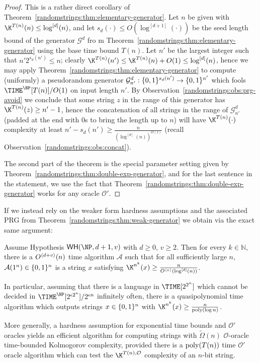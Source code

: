 \begin{proof}
This is a rather direct corollary of Theorem~\ref{randomstrings:thm:elementary-generator}. Let $n$ be given with $\K^{T(n)}(n) \leq \log^{[d]}(n)$, and let $s_d(\cdot) \leq O(\log^{[d+1]}(\cdot))$ be the seed length bound of the generator $\mathcal{G}^d$ fro m Theorem~\ref{randomstrings:thm:elementary-generator} using the base time bound $T(n)$. Let $n'$ be the largest integer such that $n'2^{s_d(n')} \leq n$; clearly $\K^{T(n)}(n') \leq \K^{T(n)}(n) + O(1) \leq \log^{[d]}(n)$, hence we may apply Theorem~\ref{randomstrings:thm:elementary-generator} to compute (uniformly) a pseudorandom generator $\mathcal{G}^d_{n'}: \{0,1\}^{s_d(n')} \to \{0,1\}^{n'}$ which fools $\TIME^{\NP}[T(n)]/O(1)$ on input length $n'$. By Observation~\ref{randomstrings:obs:prg-avoid} we conclude that some string $z$ in the range of this generator has $\K^{T(n)}(z) \geq n'-1$, hence the concatenation of all strings in the range of $\mathcal{G}^d_{n'}$ (padded at the end with $0$s to bring the length up to $n$) will have $\K^{T(n)}(\cdot)$ complexity at least $n' - s_d(n') \geq \frac{n}{(\log^{[d]}(n))^{O(1)}}$ (recall Observation~\ref{randomstrings:obs:concat}). 

The second part of the theorem is the special parameter setting given by Theorem~\ref{randomstrings:thm:double-exp-generator}, and for the last sentence in the statement, we use the fact that Theorem~\ref{randomstrings:thm:double-exp-generator} works for any oracle $\mathcal{O'}$.
\end{proof}

If we instead rely on the weaker form hardness assumptions and the associated PRG from Theorem~\ref{randomstrings:thm:weak-generator} we obtain via the exact same argument:
\begin{theorem}\label{randomstrings:thm:elementary-random-strings-weak}
Assume Hypothesis $\WH(\NP,d+1,v)$ with $d \geq 0$, $v \geq 2$. Then for every $k \in \mathbb{N}$, there is a $O^{\langle d+v \rangle}(n)$ time algorithm $\mathcal{A}$ such that for all sufficiently large $n$, $\mathcal{A}(1^n) \in \{0,1\}^n$  is a string $x$ satisfying $\K^{n^k}(x) \geq  \frac{n}{\od{v}(\log^{[d]}(n))}$.

In particular, assuming that there is a language in $\TIME[2^{2^n}]$ which cannot be decided in $\TIME^\NP[2^{\epsilon 2^n}]/2^{\epsilon n}$ infinitely often, there is a quasipolynomial time algorithm which outputs strings $x \in \{0,1\}^n$ with $\K^{n^k}(x) \geq  \frac{n}{\poly(\log n)}$.

More generally, a hardness assumption for exponential time bounds and $\mathcal{O'}$ oracles yields an efficient algorithm for computing strings with $\tilde{\Omega}(n)$ $\mathcal{O}$-oracle time-bounded Kolmogorov complexity, provided there is a $\mathrm{poly}(T(n))$ time $\mathcal{O'}$ oracle algorithm which can test the $\K^{T(n), \mathcal{O}}$ complexity of an $n$-bit string.
\end{theorem}

